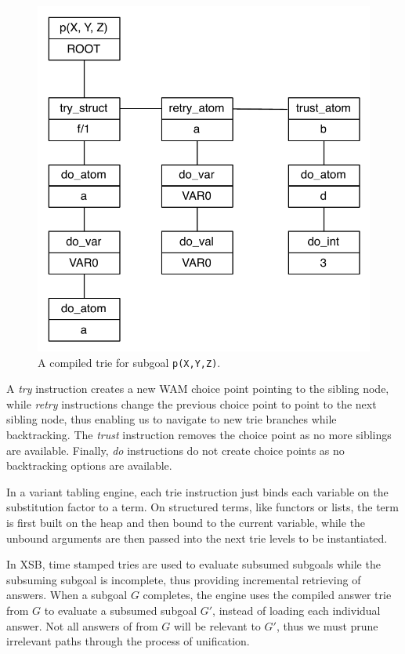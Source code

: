\begin{figure}[h]
  \centering
    \includegraphics[scale=0.6]{compiled_trie.pdf}
  \caption{A compiled trie for subgoal \texttt{p(X,Y,Z)}.}
  \label{fig:compiled_trie}
\end{figure}

A \textit{try} instruction creates a new WAM choice point pointing to the sibling node,
while \textit{retry} instructions change the previous choice point to point to the next sibling node,
thus enabling us to navigate to new trie branches while backtracking. The \textit{trust}
instruction removes the choice point as no more siblings are available. Finally, \textit{do}
instructions do not create choice points as no backtracking options are available.

In a variant tabling engine, each trie instruction just binds each variable on the substitution factor to a term.
On structured terms, like functors or lists, the term is first built on the heap and then
bound to the current variable, while the unbound arguments are then passed into the next trie levels
to be instantiated.

In XSB, time stamped tries are used to evaluate subsumed subgoals while the subsuming subgoal
is incomplete, thus providing incremental retrieving of answers.
When a subgoal $G$ completes, the engine uses the compiled answer trie from $G$
to evaluate a subsumed subgoal $G'$, instead of loading each individual answer.
Not all answers of from $G$ will be relevant to $G'$, thus we must prune irrelevant paths
through the process of unification. 


